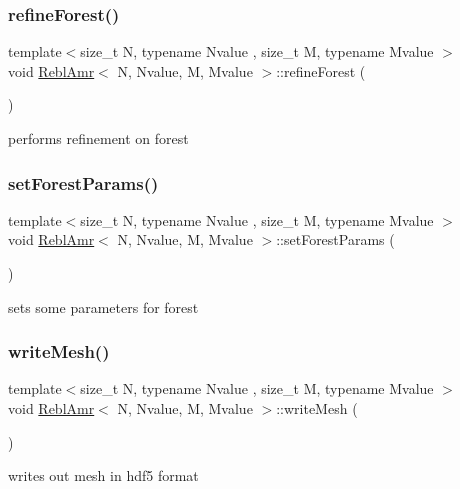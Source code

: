 \subsubsection{\texorpdfstring{refine\+Forest()}{refineForest()}}
{\footnotesize\ttfamily template$<$size\+\_\+t N, typename Nvalue , size\+\_\+t M, typename Mvalue $>$ \\
void \mbox{\hyperlink{classReblAmr}{Rebl\+Amr}}$<$ N, Nvalue, M, Mvalue $>$\+::refine\+Forest (\begin{DoxyParamCaption}{ }\end{DoxyParamCaption})}

performs refinement on forest \mbox{\label{classReblAmr_ad6f63b60c46c82769a9d865f44a329dd}} 
\subsubsection{\texorpdfstring{set\+Forest\+Params()}{setForestParams()}}
{\footnotesize\ttfamily template$<$size\+\_\+t N, typename Nvalue , size\+\_\+t M, typename Mvalue $>$ \\
void \mbox{\hyperlink{classReblAmr}{Rebl\+Amr}}$<$ N, Nvalue, M, Mvalue $>$\+::set\+Forest\+Params (\begin{DoxyParamCaption}{ }\end{DoxyParamCaption})}

sets some parameters for forest \mbox{\label{classReblAmr_ae457adbea6445bc3a407b3e4ee1aa06b}} 
\subsubsection{\texorpdfstring{write\+Mesh()}{writeMesh()}}
{\footnotesize\ttfamily template$<$size\+\_\+t N, typename Nvalue , size\+\_\+t M, typename Mvalue $>$ \\
void \mbox{\hyperlink{classReblAmr}{Rebl\+Amr}}$<$ N, Nvalue, M, Mvalue $>$\+::write\+Mesh (\begin{DoxyParamCaption}{ }\end{DoxyParamCaption})}

writes out mesh in hdf5 format \mbox{\label{classReblAmr_a1a5f144fa6c749227315f0098bc9ac7f}} 
